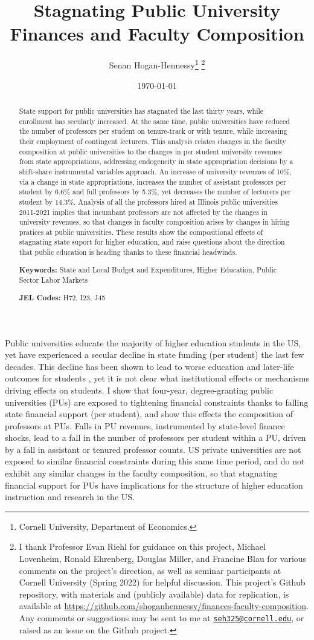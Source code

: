 \documentclass[notitlepage,12pt]{article}
\author{Senan Hogan-Hennessy\thanks{
    Cornell University, Department of Economics.}
    \thanks{I thank Professor Evan Riehl for guidance on this project, Michael Lovenheim, Ronald Ehrenberg, Douglas Miller, and Francine Blau for various comments on the project's direction,
    as well as seminar participants at Cornell University (Spring 2022) for helpful
    discussion.
    This project's Github repository, with materials and (publicly available) data for replication, is available at 
    \url{https://github.com/shoganhennessy/finances-faculty-composition}.
    Any comments or suggestions may be sent to me at \href{mailto:seh325@cornell.edu}{\nolinkurl{seh325@cornell.edu}}, or raised as an issue on the Github project.}}
\title{Stagnating Public University Finances and Faculty Composition}
\date{\today}
\begin{document}
\clearpage \maketitle
\thispagestyle{empty}
\begin{abstract}
\noindent
State support for public universities has stagnated the last thirty years, while enrollment has secularly increased.
At the same time, public universities have reduced the number of professors per student on tenure-track or with tenure, while increasing their employment of contingent lecturers.
This analysis relates changes in the faculty composition at public universities to the changes in per student university revenues from state appropriations, addressing endogeneity in state appropriation decisions by a shift-share instrumental variables approach.
An increase of university revenues of 10\%, via a change in state appropriations, increases the number of assistant professors per student by 6.6\% and full professors by 5.3\%, yet decreases the number of lecturers per student by 14.3\%.
Analysis of all the professors hired at Illinois public universities 2011-2021 implies that incumbant professors are not affected by the changes in university revenues, so that changes in faculty composition arises by changes in hiring pratices at public universities.
These results show the compositional effects of stagnating state suport for higher education, and raise questions about the direction that public education is heading thanks to these financial headwinds.

\vspace{0.75cm}
\noindent\textbf{Keywords:}
State and Local Budget and Expenditures,
Higher Education,
Public Sector Labor Markets

\vspace{0.5cm}
\noindent\textbf{JEL Codes:} H72, I23, J45
\end{abstract}
\newpage
\setcounter{page}{1}
\newpage
\doublespacing


\noindent
Public universities educate the majority of higher education students in the US, yet have experienced a secular decline in state funding (per student) the last few decades.
This decline has been shown to lead to worse education and later-life outcomes for students \citep{NBERw23736,NBERw27885}, yet it is not clear what institutional effects or mechanisms driving effects on students.
I show that four-year, degree-granting public universities (PUs) are exposed to tightening financial constraints thanks to falling state financial support (per student), and show this effects the composition of professors at PUs.
Falls in PU revenues, instrumented by state-level finance shocks, lead to a fall in the number of professors per student within a PU, driven by a fall in assistant or tenured professor counts.
US private universities are not exposed to similar financial constraints during this same time period, and do not exhibit any similar changes in the faculty composition, so that stagnating financial support for PUs have implications for the structure of higher education instruction and research in the US.
\end{document}

